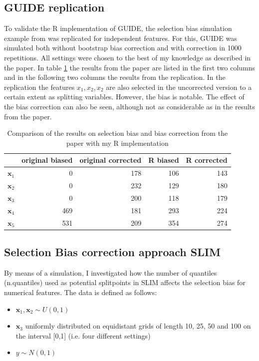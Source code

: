 \subsection{GUIDE replication}
To validate the R implementation of GUIDE, the selection bias simulation example from \citep{Loh.2002} was replicated for independent features. For this, GUIDE was simulated both without bootstrap bias correction and with correction in 1000 repetitions. All settings were chosen to the best of my knowledge as described in the paper. In table \ref{tab:app_guide_selection_bias} the results from the paper are listed in the first two columns and in the following two columns the results from the replication. In the replication the features $x_1, x_2, x_2$ are also selected in the uncorrected version to a certain extent as splitting variables. However, the bias is notable. The effect of the bias correction can also be seen, although not as considerable as in the results from the paper. 

\begin{table}[!htb]
\centering
\begin{tabular}[t]{l|rr|rr}
\hline
  & original biased & original corrected & R biased & R corrected\\
\hline
$\textbf{x}_1$ & 0 & 178 & 106 & 143\\
$\textbf{x}_2$ & 0 & 232 & 129 & 180\\
$\textbf{x}_3$ & 0 & 200 & 118 & 179\\
$\textbf{x}_4$ & 469 & 181 & 293 & 224\\
$\textbf{x}_5$ & 531 & 209 & 354 & 274\\
\hline
\end{tabular}
\caption{Comparison of the results on selection bias and bias correction from the paper \citep{Loh.2002} with my R implementation}
\label{tab:app_guide_selection_bias}
\end{table}

\subsection{Selection Bias correction approach SLIM}

By means of a simulation, I investigated how the number of quantiles (n.quantiles) used as potential splitpoints in SLIM affects the selection bias for numerical features. 
The data is defined as follows:
\begin{itemize}
    \item $\textbf{x}_1, \textbf{x}_2 \sim U(0,1)$
    \item $\textbf{x}_3$ uniformly distributed on equidistant grids of length 10, 25, 50 and 100 on the interval [0,1] (i.e. four different settings)
    \item $y \sim N(0,1)$
\end{itemize}

